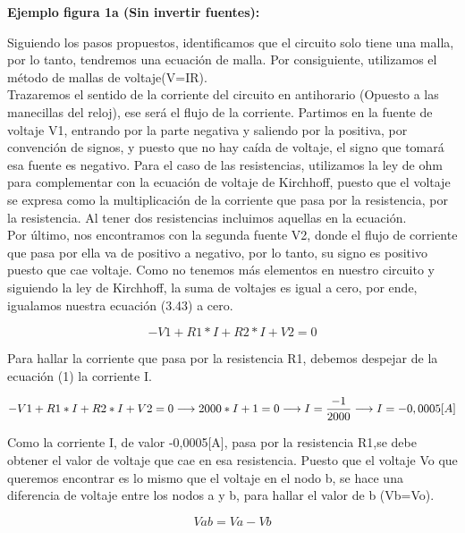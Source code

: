 \begin{example}
\begin{enumerate}
\end{enumerate}

\newpage
\textbf{Ejemplo figura 1a (Sin invertir fuentes):}

\iffalse
\begin{figure}[H]
    \centering
    \texttt{[image: image/SinFuenteinvertida1.png]}
    \caption{Circuito sin invertir fuentes y con sentido de corriente antihorario}
    \label{fig:1011101011}
\end{figure}
\fi
Siguiendo los pasos propuestos, identificamos que el circuito solo tiene una malla, por lo tanto, tendremos una ecuación de malla. Por consiguiente, utilizamos el método de mallas de voltaje(V=IR).
\\
Trazaremos el sentido de la corriente del circuito en antihorario (Opuesto a las manecillas del reloj), ese será el flujo de la corriente. Partimos en la fuente de voltaje V1, entrando por la parte negativa y saliendo por la positiva, por convención de signos, y puesto que no hay caída de voltaje, el signo que tomará esa fuente es negativo. Para el caso de las resistencias, utilizamos la ley de ohm para complementar con la ecuación de voltaje de Kirchhoff, puesto que el voltaje se expresa como la multiplicación de la corriente que pasa por la resistencia, por la resistencia. Al tener dos resistencias incluimos aquellas en la ecuación.
\\
Por último, nos encontramos con la segunda fuente V2, donde el flujo de corriente que pasa por ella va de positivo a negativo, por lo tanto, su signo es positivo puesto que cae voltaje. Como no tenemos más elementos en nuestro circuito y siguiendo la ley de Kirchhoff, la suma de voltajes es igual a cero, por ende, igualamos nuestra ecuación (3.43) a cero.
\begin{center}
\begin {equation*}
-V1+R1*I+R2*I+V2=0
\end {equation*}
\end{center}

Para hallar la corriente que pasa por la resistencia R1, debemos despejar de la ecuación (1) la corriente I. 


\begin {equation*}
\notag
-V1+R1*I+R2*I+V2=0
\longrightarrow
2000*I+1=0
\longrightarrow
I= \frac{-1}{2000}
\longrightarrow
I=-0,0005[A]
\end {equation*}

Como la corriente I, de valor -0,0005[A], pasa por la resistencia R1,se debe obtener el valor de voltaje que cae en esa resistencia. Puesto que el voltaje Vo que queremos encontrar es lo mismo que el voltaje en el nodo b, se hace una diferencia de voltaje entre los nodos a y b, para hallar el valor de b (Vb=Vo).
\begin{center}
\begin {equation*}
Vab=Va-Vb
\end {equation*}
\end{center}


\end{example}

